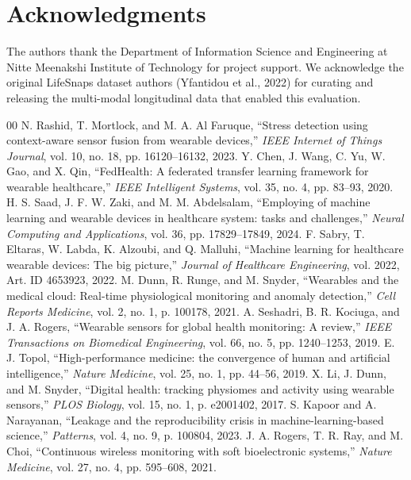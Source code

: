 \documentclass[conference]{IEEEtran}
\begin{document}
\section*{Acknowledgments}

The authors thank the Department of Information Science and Engineering at Nitte Meenakshi Institute of Technology for project support. We acknowledge the original LifeSnaps dataset authors (Yfantidou et al., 2022) for curating and releasing the multi-modal longitudinal data that enabled this evaluation.

\begin{thebibliography}{00}
 N. Rashid, T. Mortlock, and M. A. Al Faruque, ``Stress detection using context-aware sensor fusion from wearable devices,'' \emph{IEEE Internet of Things Journal}, vol. 10, no. 18, pp. 16120--16132, 2023.
 Y. Chen, J. Wang, C. Yu, W. Gao, and X. Qin, ``FedHealth: A federated transfer learning framework for wearable healthcare,'' \emph{IEEE Intelligent Systems}, vol. 35, no. 4, pp. 83--93, 2020.
 H. S. Saad, J. F. W. Zaki, and M. M. Abdelsalam, ``Employing of machine learning and wearable devices in healthcare system: tasks and challenges,'' \emph{Neural Computing and Applications}, vol. 36, pp. 17829--17849, 2024.
 F. Sabry, T. Eltaras, W. Labda, K. Alzoubi, and Q. Malluhi, ``Machine learning for healthcare wearable devices: The big picture,'' \emph{Journal of Healthcare Engineering}, vol. 2022, Art. ID 4653923, 2022.
 M. Dunn, R. Runge, and M. Snyder, ``Wearables and the medical cloud: Real-time physiological monitoring and anomaly detection,'' \emph{Cell Reports Medicine}, vol. 2, no. 1, p. 100178, 2021.
 A. Seshadri, B. R. Kociuga, and J. A. Rogers, ``Wearable sensors for global health monitoring: A review,'' \emph{IEEE Transactions on Biomedical Engineering}, vol. 66, no. 5, pp. 1240--1253, 2019.
 E. J. Topol, ``High-performance medicine: the convergence of human and artificial intelligence,'' \emph{Nature Medicine}, vol. 25, no. 1, pp. 44--56, 2019.
 X. Li, J. Dunn, and M. Snyder, ``Digital health: tracking physiomes and activity using wearable sensors,'' \emph{PLOS Biology}, vol. 15, no. 1, p. e2001402, 2017.
 S. Kapoor and A. Narayanan, ``Leakage and the reproducibility crisis in machine-learning-based science,'' \emph{Patterns}, vol. 4, no. 9, p. 100804, 2023.
 J. A. Rogers, T. R. Ray, and M. Choi, ``Continuous wireless monitoring with soft bioelectronic systems,'' \emph{Nature Medicine}, vol. 27, no. 4, pp. 595--608, 2021.

\end{thebibliography}
\end{document}
